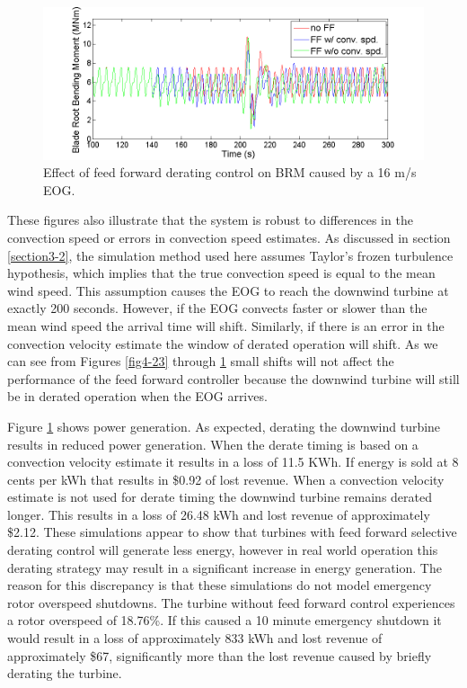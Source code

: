 \begin{figure}[htb]
	\centering
		\includegraphics[width = \linewidth]{Figures/ch4Figures/fig4-25.png}
		
	\caption{Effect of feed forward derating control on BRM caused by a 16 m/s EOG.}
	\label{fig4-25}
\end{figure}



These figures also illustrate that the system is robust to differences in the convection speed or errors in convection speed estimates. As discussed in section \ref{section3-2}, the simulation method used here assumes Taylor's frozen turbulence hypothesis, which implies that the true convection speed is equal to the mean wind speed. This assumption causes the EOG to reach the downwind turbine at exactly 200 seconds. However, if the EOG convects faster or slower than the mean wind speed the arrival time will shift. Similarly, if there is an error in the convection velocity estimate the window of derated operation will shift. As we can see from Figures \ref{fig4-23} through \ref{fig4-25} small shifts will not affect the performance of the feed forward controller because the downwind turbine will still be in derated operation when the EOG arrives.

Figure \ref{fig4-25} shows power generation. As expected, derating the downwind turbine results in reduced power generation. When the derate timing is based on a convection velocity estimate it results in a loss of 11.5 KWh. If energy is sold at 8 cents per kWh that results in \$0.92 of lost revenue. When a convection velocity estimate is not used for derate timing the downwind turbine remains derated longer. This results in a loss of 26.48 kWh and lost revenue of approximately \$2.12. These simulations appear to show that turbines with feed forward selective derating control will generate less energy, however in real world operation this derating strategy may result in a significant increase in energy generation. The reason for this discrepancy is that these simulations do not model emergency rotor overspeed shutdowns. The turbine without feed forward control experiences a rotor overspeed of 18.76\%. If this caused a 10 minute emergency shutdown it would result in a loss of approximately 833 kWh and lost revenue of approximately \$67, significantly more than the lost revenue caused by briefly derating the turbine.

